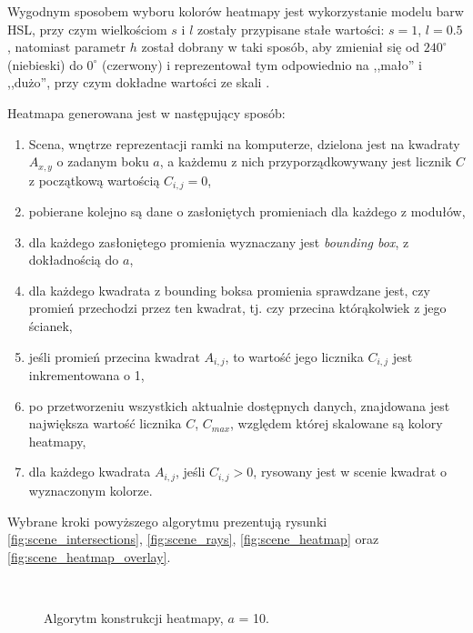 Wygodnym sposobem wyboru kolorów heatmapy jest wykorzystanie modelu barw HSL, przy czym wielkościom $s$ i $l$ zostały przypisane stałe wartości: $s = 1$, $l = 0.5$, natomiast parametr $h$ został dobrany w taki sposób, aby zmieniał się od $240^{\circ}$ (niebieski) do $0^{\circ}$ (czerwony) i reprezentował tym odpowiednio na ,,mało'' i ,,dużo'', przy czym dokładne wartości ze skali .

Heatmapa generowana jest w następujący sposób:
\begin{enumerate}
 \item Scena, wnętrze reprezentacji ramki na komputerze, dzielona jest na kwadraty $A_{x,y}$ o zadanym boku $a$, a każdemu z nich przyporządkowywany jest licznik $C$ z początkową wartością $C_{i,j} = 0$,
 \item pobierane kolejno są dane o zasłoniętych promieniach dla każdego z modułów,
 \item dla każdego zasłoniętego promienia wyznaczany jest \textit{bounding box}, z dokładnością do $a$,
 \item dla każdego kwadrata z bounding boksa promienia sprawdzane jest, czy promień przechodzi przez ten kwadrat, tj. czy przecina którąkolwiek z jego ścianek,
 \item jeśli promień przecina kwadrat $A_{i,j}$, to wartość jego licznika $C_{i,j}$ jest inkrementowana o 1,
 \item po przetworzeniu wszystkich aktualnie dostępnych danych, znajdowana jest największa wartość licznika $C$, $C_{max}$, względem której skalowane są kolory heatmapy,
 \item dla każdego kwadrata $A_{i,j}$, jeśli $C_{i,j} > 0$, rysowany jest w scenie kwadrat o wyznaczonym kolorze.
\end{enumerate}

Wybrane kroki powyższego algorytmu prezentują rysunki \ref{fig:scene_intersections}, \ref{fig:scene_rays}, \ref{fig:scene_heatmap} oraz \ref{fig:scene_heatmap_overlay}.

\begin{sidewaysfigure}[tbh]
  \myfloatalign
   \quad
   \\
   \quad
  \caption[Algorytm konstrukcji heatmapy]{Algorytm konstrukcji heatmapy, $a$ = 10.}\label{fig:scene_heatmap_algorithm}
\end{sidewaysfigure}

\clearpage
